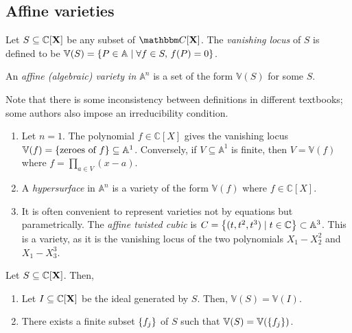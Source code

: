 \subsection{Affine varieties}
\begin{definition}
    Let \( S \subseteq \mathbb C[\vb X] \) be any subset of \( \mathbbm C[\vb X] \).
    The \emph{vanishing locus} of \( S \) is defined to be \( \mathbb V(S) = \qty{P \in \mathbb A \mid \forall f \in S,\, f(P) = 0} \).
\end{definition}
\begin{definition}
    An \emph{affine (algebraic) variety in \( \mathbb A^n \)} is a set of the form \( \mathbb V(S) \) for some \( S \).
\end{definition}
Note that there is some inconsistency between definitions in different textbooks; some authors also impose an irreducibility condition.
\begin{example}
    \begin{enumerate}
        \item Let \( n = 1 \).
        The polynomial \( f \in \mathbb C[X] \) gives the vanishing locus \( \mathbb V(f) = \qty{\text{zeroes of } f} \subseteq \mathbb A^1 \).
        Conversely, if \( V \subseteq \mathbb A^1 \) is finite, then \( V = \mathbb V(f) \) where \( f = \prod_{a \in V} (x - a) \).
        \item A \emph{hypersurface} in \( \mathbb A^n \) is a variety of the form \( \mathbb V(f) \) where \( f \in \mathbb C[X] \).
        \item It is often convenient to represent varieties not by equations but parametrically.
        The \emph{affine twisted cubic} is \( C = \qty{(t, t^2, t^3) \mid t \in \mathbb C} \subset \mathbb A^3 \).
        This is a variety, as it is the vanishing locus of the two polynomials \( X_1 - X_2^2 \) and \( X_1 - X_3^3 \).
    \end{enumerate}
\end{example}
\begin{theorem}
    Let \( S \subseteq \mathbb C[\vb X] \).
    Then,
    \begin{enumerate}
        \item Let \( I \subseteq \mathbb C[\vb X] \) be the ideal generated by \( S \).
        Then, \( \mathbb V(S) = \mathbb V(I) \).
        \item There exists a finite subset \( \qty{f_j} \) of \( S \) such that \( \mathbb V(S) = \mathbb V(\qty{f_j}) \).
    \end{enumerate}
\end{theorem}
